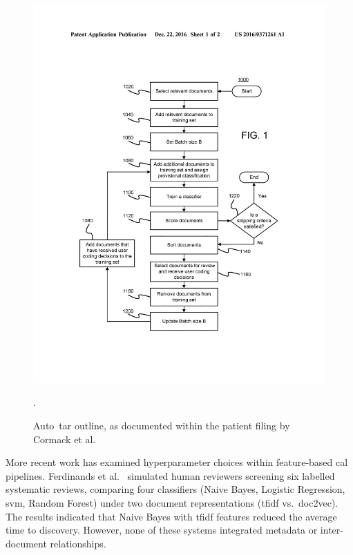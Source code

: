 \documentclass[10pt,oneside]{book}
\begin{document}
\begin{figure}
    \centering
    \includegraphics[width=0.95\linewidth]{Confirmation Review/images/autotar.jpg}
    \caption{Auto~\gls*{tar} outline, as documented within the patient filing by Cormack et al. \cite{cormack_systems_2016}\protect\footnotemark}.
    \label{fig:autotar_process}
\end{figure}


More recent work has examined hyperparameter choices within feature-based \gls*{cal} pipelines. Ferdinands et al.~\cite{ferdinands_performance_2023} simulated human reviewers screening six labelled systematic reviews, comparing four classifiers (Naive Bayes, Logistic Regression, \gls*{svm}, Random Forest) under two document representations (\gls*{tfidf} vs.\ doc2vec). The results indicated that Naive Bayes with \gls*{tfidf} features reduced the average time to discovery. However, none of these systems integrated metadata or inter-document relationships.
\end{document}

